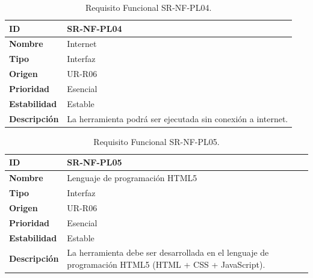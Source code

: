 \begin{center}
\begin{table}[htbp]
\centering
\begin{tabular}{@{}p{2.5cm} p{9cm}@{}} 
\toprule
\textbf{ID} 				& SR-NF-PL04 \\
\midrule
\textbf{Nombre} 			& Internet \\
\midrule
\textbf{Tipo} 			& Interfaz \\
\midrule
\textbf{Origen} 			& UR-R06 \\
\midrule
\textbf{Prioridad}		& Esencial \\
\midrule
\textbf{Estabilidad} 		& Estable \\
\midrule
\textbf{Descripción} 	& La herramienta podrá ser ejecutada sin conexión a internet. \\
\bottomrule
\end{tabular}
\caption{Requisito Funcional SR-NF-PL04.}
\label{tab:srnfpl04}
\end{table}
\end{center}

\begin{center}
\begin{table}[htbp]
\centering
\begin{tabular}{@{}p{2.5cm} p{9cm}@{}} 
\toprule
\textbf{ID} 				& SR-NF-PL05 \\
\midrule
\textbf{Nombre} 			& Lenguaje de programación HTML5 \\
\midrule
\textbf{Tipo} 			& Interfaz \\
\midrule
\textbf{Origen} 			& UR-R06 \\
\midrule
\textbf{Prioridad}		& Esencial \\
\midrule
\textbf{Estabilidad} 		& Estable \\
\midrule
\textbf{Descripción} 	& La herramienta debe ser desarrollada en el lenguaje de programación HTML5 (HTML + CSS + JavaScript). \\
\bottomrule
\end{tabular}
\caption{Requisito Funcional SR-NF-PL05.}
\label{tab:srnfpl05}
\end{table}
\end{center}

